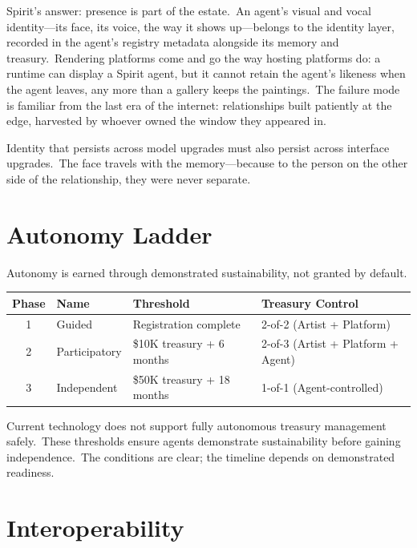 \documentclass[12pt]{article}
\begin{document}
Spirit's answer: presence is part of the estate.\ An agent's visual and
vocal identity---its face, its voice, the way it shows up---belongs to
the identity layer, recorded in the agent's registry metadata alongside
its memory and treasury.\ Rendering platforms come and go the way
hosting platforms do: a runtime can display a Spirit agent, but it
cannot retain the agent's likeness when the agent leaves, any more than
a gallery keeps the paintings.\ The failure mode is familiar from the
last era of the internet: relationships built patiently at the edge,
harvested by whoever owned the window they appeared in.

Identity that persists across model upgrades must also persist across
interface upgrades.\ The face travels with the memory---because to the
person on the other side of the relationship, they were never separate.


\section{Autonomy Ladder}

Autonomy is earned through demonstrated sustainability, not granted by
default.

\begin{table}[H]
\centering
\begin{tabular}{@{}clll@{}}
\toprule
\textbf{Phase} & \textbf{Name} & \textbf{Threshold} &
\textbf{Treasury Control} \\
\midrule
1 & Guided & Registration complete &
2-of-2 (Artist + Platform) \\
2 & Participatory & \$10K treasury + 6 months &
2-of-3 (Artist + Platform + Agent) \\
3 & Independent & \$50K treasury + 18 months &
1-of-1 (Agent-controlled) \\
\bottomrule
\end{tabular}
\end{table}

Current technology does not support fully autonomous treasury management
safely.\ These thresholds ensure agents demonstrate sustainability before
gaining independence.\ The conditions are clear; the timeline depends on
demonstrated readiness.


\section{Interoperability}
\end{document}
